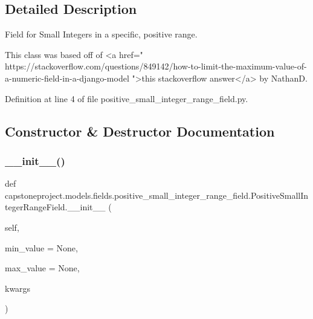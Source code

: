 \subsection{Detailed Description}
\begin{DoxyVerb}Field for Small Integers in a specific, positive range.

This class was based off of <a href="
https://stackoverflow.com/questions/849142/how-to-limit-the-maximum-value-of-a-numeric-field-in-a-django-model
">this stackoverflow answer</a> by NathanD.
\end{DoxyVerb}
 

Definition at line 4 of file positive\+\_\+small\+\_\+integer\+\_\+range\+\_\+field.\+py.



\subsection{Constructor \& Destructor Documentation}
\mbox{\label{classcapstoneproject_1_1models_1_1fields_1_1positive__small__integer__range__field_1_1_positive_small_integer_range_field_a10fbbb5e5f49ba11d7f2333711f9ce34}} 
\subsubsection{\texorpdfstring{\+\_\+\+\_\+init\+\_\+\+\_\+()}{\_\_init\_\_()}}
{\footnotesize\ttfamily def capstoneproject.\+models.\+fields.\+positive\+\_\+small\+\_\+integer\+\_\+range\+\_\+field.\+Positive\+Small\+Integer\+Range\+Field.\+\_\+\+\_\+init\+\_\+\+\_\+ (\begin{DoxyParamCaption}\item[{}]{self,  }\item[{}]{min\+\_\+value = {\ttfamily None},  }\item[{}]{max\+\_\+value = {\ttfamily None},  }\item[{}]{kwargs }\end{DoxyParamCaption})}

